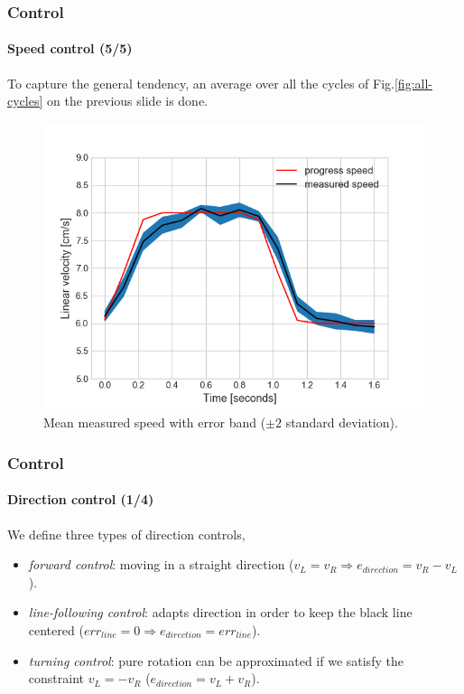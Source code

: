 \documentclass[10pt]{beamer}
\begin{document}
\begin{frame}
\frametitle{Control}
\framesubtitle{Speed control (5/5)}
To capture the general tendency, an average over all the cycles of Fig.\ref{fig:all-cycles} on the previous slide is done. 
\begin{figure}[hbtp]
\centering
\includegraphics[scale=0.45]{figures/pid_speed_shaded.png}
\caption{Mean measured speed with error band ($\pm 2$ standard deviation).}
\label{fig:average-pid}
\end{figure}
\end{frame}


\begin{frame}[label={frame:control-direction}]
\frametitle{Control}
\framesubtitle{Direction control (1/4)}
We define three types of direction controls,
\begin{itemize}
\item \textit{forward control}: moving in a straight direction ($v_L = v_R \Rightarrow e_{direction} = v_R - v_L$).
\item \textit{line-following control}: adapts direction in order to keep the black line centered ($err_{line} = 0 \Rightarrow e_{direction} = err_{line}$).
\item \textit{turning control}: pure rotation can be approximated if we satisfy the constraint  $v_L = -v_R$ ($e_{direction} = v_L + v_R$).
\end{itemize}
\end{frame}

\end{document}
